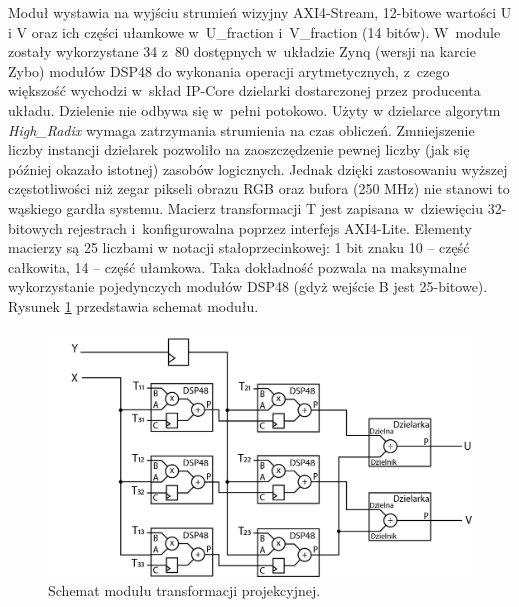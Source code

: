 Moduł wystawia na wyjściu strumień wizyjny AXI4-Stream, 12-bitowe wartości U i V oraz ich części ułamkowe w~U\_fraction i~V\_fraction (14 bitów). 
W~module zostały wykorzystane 34 z~80 dostępnych w~układzie Zynq (wersji na karcie Zybo) modułów DSP48 do wykonania operacji arytmetycznych, z~czego większość wychodzi w~skład IP-Core dzielarki dostarczonej przez producenta układu.
Dzielenie nie odbywa się w~pełni potokowo. 
Użyty w dzielarce algorytm \textit{High\_Radix} wymaga zatrzymania strumienia na czas obliczeń. 
Zmniejszenie liczby instancji dzielarek pozwoliło na zaoszczędzenie pewnej liczby (jak się później okazało istotnej) zasobów logicznych.
Jednak dzięki zastosowaniu wyższej częstotliwości niż zegar pikseli obrazu RGB oraz bufora (250 MHz) nie stanowi to wąskiego gardła systemu. 
Macierz transformacji T jest zapisana w~dziewięciu 32-bitowych rejestrach i~konfigurowalna poprzez interfejs AXI4-Lite.
Elementy macierzy są 25 liczbami w notacji stałoprzecinkowej: 1 bit znaku 10 -- część całkowita, 14 -- część ułamkowa. 
Taka dokładność pozwala na maksymalne wykorzystanie pojedynczych modułów DSP48 (gdyż wejście B jest 25-bitowe). 
Rysunek \ref{fig:transfProjek} przedstawia schemat modułu.
\begin{figure}
\centering
\includegraphics[width=0.70\linewidth]{images/transfProjek.png}
\caption[Schemat modułu transformacji projekcyjnej.]{Schemat modułu transformacji projekcyjnej.}
\label{fig:transfProjek}
\end{figure}

